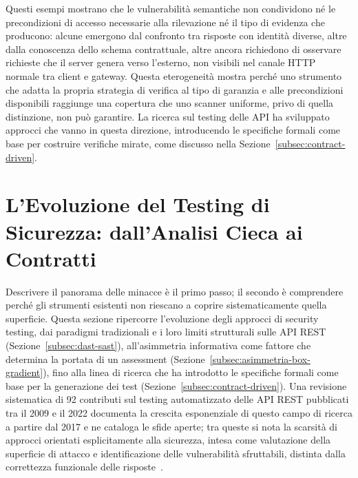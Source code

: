 Questi esempi mostrano che le vulnerabilità semantiche non condividono né le precondizioni di accesso necessarie alla rilevazione né il tipo di evidenza che producono: alcune emergono dal confronto tra risposte con identità diverse, altre dalla conoscenza dello schema contrattuale, altre ancora richiedono di osservare richieste che il server genera verso l'esterno, non visibili nel canale HTTP normale tra client e gateway. Questa eterogeneità mostra perché uno strumento che adatta la propria strategia di verifica al tipo di garanzia e alle precondizioni disponibili raggiunge una copertura che uno scanner uniforme, privo di quella distinzione, non può garantire. La ricerca sul testing delle \gls{API} ha sviluppato approcci che vanno in questa direzione, introducendo le specifiche formali come base per costruire verifiche mirate, come discusso nella Sezione~\ref{subsec:contract-driven}.

\section{L'Evoluzione del Testing di Sicurezza: dall'Analisi Cieca ai Contratti}%
\label{sec:testing-evolution}

Descrivere il panorama delle minacce è il primo passo; il secondo è comprendere perché gli strumenti esistenti non riescano a coprire sistematicamente quella superficie.
Questa sezione ripercorre l'evoluzione degli approcci di security testing, dai paradigmi tradizionali e i loro limiti strutturali sulle \gls{API} REST (Sezione~\ref{subsec:dast-sast}), all'asimmetria informativa come fattore che determina la portata di un assessment (Sezione~\ref{subsec:asimmetria-box-gradient}), fino alla linea di ricerca che ha introdotto le specifiche formali come base per la generazione dei test (Sezione~\ref{subsec:contract-driven}). Una revisione sistematica di 92 contributi sul testing automatizzato delle \gls{API} REST pubblicati tra il 2009 e il 2022 documenta la crescita esponenziale di questo campo di ricerca a partire dal 2017 e ne cataloga le sfide aperte; tra queste si nota la scarsità di approcci orientati esplicitamente alla sicurezza, intesa come valutazione della superficie di attacco e identificazione delle vulnerabilità sfruttabili, distinta dalla correttezza funzionale delle risposte~\cite{golmohammadiTestingRESTfulAPIs2023}.

